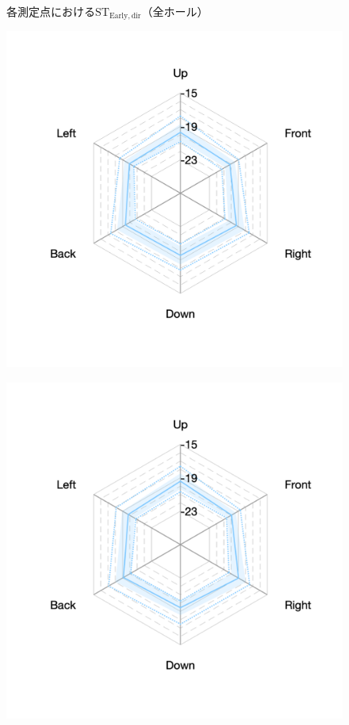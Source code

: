 \documentclass[11pt,a4j]{jreport}
\begin{document}
\begin{figure}[H]
\caption{各測定点における$\mathrm{ST_{Early,dir}}$（全ホール）}
\label{fig:各測定点におけるSTEarly}
\end{figure}


\newpage
\begin{figure}[H]
  \begin{minipage}[b]{.33\textwidth}
      \centering
      \includegraphics[width=1\linewidth]{images/realHallDirSt/late_S03_allhall.png}
      \label{fig:S03late}
  \end{minipage}%
  \begin{minipage}[b]{.33\textwidth}
    \centering
    \includegraphics[width=1\linewidth]{images/realHallDirSt/late_S02_allhall.png}

\end{minipage}
\end{figure}
\end{document}
